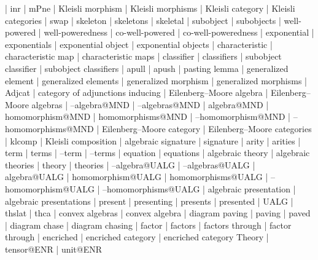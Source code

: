     |   inr
    |   mPne
    |   Kleisli morphism
    |   Kleisli morphisms
    |   Kleisli category
    |   Kleisli categories
    |   swap
    |   skeleton
    |   skeletons
    |   skeletal
    |   subobject
    |   subobjects
    |   well-powered
    |   well-poweredness
    |   co-well-powered
    |   co-well-poweredness
    |   exponential
    |   exponentials
    |   exponential object
    |   exponential objects
    |   characteristic
    |   characteristic map
    |   characteristic maps
    |   classifier
    |   classifiers
    |   subobject classifier
    |   subobject classifiers
    |   apull
    |   apush
    |   pasting lemma
    |   generalized element
    |   generalized elements
    |   generalized morphism
    |   generalized morphisms
    |   Adjcat
    |   category of adjunctions inducing
    |   Eilenberg--Moore algebra
    |   Eilenberg--Moore algebras
    |   --algebra@MND
    |   --algebras@MND
    |   algebra@MND
    |   homomorphism@MND
    |   homomorphisms@MND
    |   --homomorphism@MND
    |   --homomorphisms@MND
    |   Eilenberg--Moore category
    |   Eilenberg--Moore categories
    |   klcomp
    |   Kleisli composition
    |   algebraic signature
    |   signature
    |   arity
    |   arities
    |   term
    |   terms
    |   --term
    |   --terms
    |   equation
    |   equations
    |   algebraic theory
    |   algebraic theories
    |   theory
    |   theories
    |   --algebra@UALG
    |   --algebras@UALG
    |   algebra@UALG
    |   homomorphism@UALG
    |   homomorphisms@UALG
    |   --homomorphism@UALG
    |   --homomorphisms@UALG
    |   algebraic presentation
    |   algebraic presentations
    |   present
    |   presenting
    |   presents
    |   presented
    |   UALG
    |   thslat
    |   thca
    |   convex algebras
    |   convex algebra
    |   diagram paving
    |   paving
    |   paved
    |   diagram chase
    |   diagram chasing
    |   factor
    |   factors
    |   factors through
    |   factor through
    |   encriched
    |   encriched category
    |   encriched category Theory
    |   tensor@ENR
    |   unit@ENR

